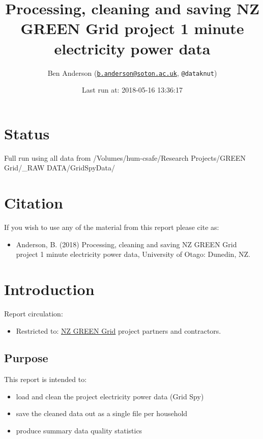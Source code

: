 \documentclass[]{article}
\title{Processing, cleaning and saving NZ GREEN Grid project 1 minute
electricity power data}
\author{Ben Anderson
(\href{mailto:b.anderson@soton.ac.uk}{\nolinkurl{b.anderson@soton.ac.uk}},
\texttt{@dataknut})}
\date{Last run at: 2018-05-16 13:36:17}
\providecommand{\tightlist}{%
  \setlength{\itemsep}{0pt}\setlength{\parskip}{0pt}}
\begin{document}
\maketitle

{
\setcounter{tocdepth}{2}
\tableofcontents
}
\newpage

\section{Status}\label{status}

Full run using all data from /Volumes/hum-csafe/Research Projects/GREEN
Grid/\_RAW DATA/GridSpyData/

\section{Citation}\label{citation}

If you wish to use any of the material from this report please cite as:

\begin{itemize}
\tightlist
\item
  Anderson, B. (2018) Processing, cleaning and saving NZ GREEN Grid
  project 1 minute electricity power data, University of Otago: Dunedin,
  NZ.
\end{itemize}

\newpage

\section{Introduction}\label{introduction}

Report circulation:

\begin{itemize}
\tightlist
\item
  Restricted to:
  \href{https://www.otago.ac.nz/centre-sustainability/research/energy/otago050285.html}{NZ
  GREEN Grid} project partners and contractors.
\end{itemize}

\subsection{Purpose}\label{purpose}

This report is intended to:

\begin{itemize}
\tightlist
\item
  load and clean the project electricity power data (Grid Spy)
\item
  save the cleaned data out as a single file per household
\item
  produce summary data quality statistics
\end{itemize}
\end{document}
